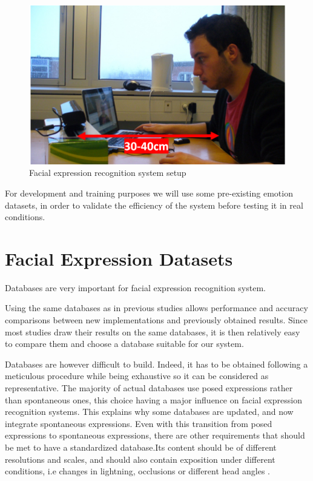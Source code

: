 \begin{figure}[!h]
\begin{center}
\noindent \includegraphics[scale=0.6]{figures/system_setup} 
\newline
\caption{Facial expression recognition system setup}
\label{system_setup}
\end{center} 
\end{figure}

\noindent For development and training purposes we will use some pre-existing emotion datasets, in order to validate the efficiency of the system before testing it in real conditions.
\newline

\section{Facial Expression Datasets}

\vspace{\baselineskip}
\noindent Databases are very important for facial expression recognition system.
\newline

\noindent Using the same databases as in previous studies allows performance and accuracy comparisons between new implementations and previously obtained results. Since most studies draw their results on the same databases, it is then relatively easy to compare them and choose a database suitable for our system.
\newline

\noindent Databases are however difficult to build. Indeed, it has to be obtained following a meticulous procedure while being exhaustive so it can be considered as representative. The majority of actual databases use posed expressions rather than spontaneous ones, this choice having a major influence on facial expression recognition systems. This explains why some databases are updated, and now integrate spontaneous expressions. Even with this transition from posed expressions to spontaneous expressions, there are other requirements that should be met to have a standardized database.Its content should be of different resolutions and scales, and should also contain exposition under different conditions, i.e changes in lightning, occlusions or different head angles \cite{BET12}.  
\newline

